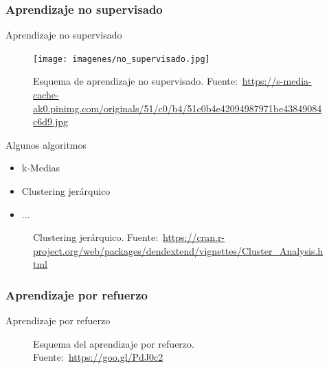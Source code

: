 \documentclass[hyperref={unicode}]{beamer}
\begin{document}
\subsubsection{Aprendizaje no supervisado}
\begin{frame}{Aprendizaje no supervisado}
	\begin{figure}
			\begin{center}
			\texttt{[image: imagenes/no\_supervisado.jpg]}
			\caption{Esquema de aprendizaje no supervisado. Fuente:~\url{https://s-media-cache-ak0.pinimg.com/originals/51/c0/b4/51c0b4e42094987971be43849084c6d9.jpg}}
			\end{center}
	\end{figure}
\end{frame}

\begin{frame}{Algunos algoritmos}

\begin{minipage}{0.3\textwidth}
	\begin{itemize}
		\item k-Medias
		\item Clustering jerárquico
		\item ...
	\end{itemize}
\end{minipage}
\hfill
\begin{minipage}{0.65\textwidth}
	\begin{figure}[htbp!]
		\centering
		\caption{Clustering jerárquico. Fuente:~\url{https://cran.r-project.org/web/packages/dendextend/vignettes/Cluster_Analysis.html}}
	\end{figure}
\end{minipage}
	
\end{frame}

\subsubsection{Aprendizaje por refuerzo}
\begin{frame}{Aprendizaje por refuerzo}
	
	\begin{figure}[htbp!]
			\centering
			\caption{Esquema del aprendizaje por refuerzo. Fuente:~\url{https://goo.gl/PdJ0c2}}
		\end{figure}
\end{frame}
\end{document}
